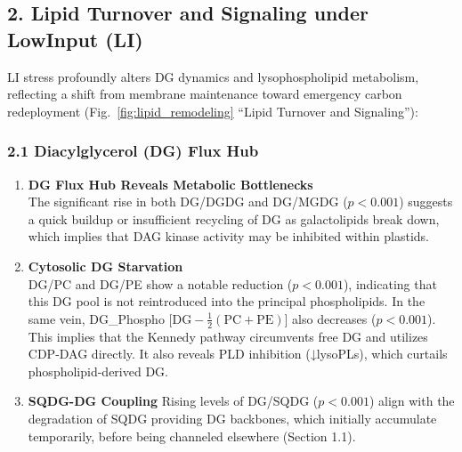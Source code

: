 \documentclass[10pt,letterpaper]{article}
\begin{document}
\subsection*{2. Lipid Turnover and Signaling under LowInput (LI)}

LI stress profoundly alters DG dynamics and lysophospholipid metabolism, reflecting a shift from membrane maintenance toward emergency carbon redeployment (Fig.~\ref{fig:lipid_remodeling} “Lipid Turnover and Signaling”):

\subsubsection*{2.1 Diacylglycerol (DG) Flux Hub}
\begin{enumerate}
  \item \textbf{DG Flux Hub Reveals Metabolic Bottlenecks} \\
  The significant rise in both DG/DGDG and DG/MGDG (\(p<0.001\)) suggests a quick buildup or insufficient recycling of DG as galactolipids break down, which implies that DAG kinase activity may be inhibited within plastids.
  
  \item \textbf{Cytosolic DG Starvation} \\
  DG/PC and DG/PE show a notable reduction (\(p<0.001\)), indicating that this DG pool is not reintroduced into the principal phospholipids. In the same vein, DG\_Phospho \(\bigl[\mathrm{DG} - \tfrac12(\mathrm{PC}+\mathrm{PE})\bigr]\) also decreases (\(p<0.001\)). This implies that the Kennedy pathway circumvents free DG and utilizes CDP-DAG directly. It also reveals PLD inhibition (↓lysoPLs), which curtails phospholipid-derived DG.
  
  \item \textbf{SQDG-DG Coupling}
  Rising levels of DG/SQDG (\(p<0.001\)) align with the degradation of SQDG providing DG backbones, which initially accumulate temporarily, before being channeled elsewhere (Section 1.1).
\end{enumerate}
\end{document}
